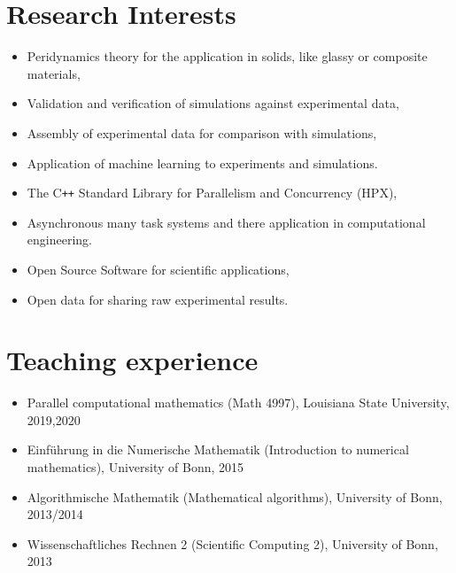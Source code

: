 \documentclass[11pt,a4paper,sans]{moderncv}
\begin{document}
\section{Research Interests}

\begin{itemize}[leftmargin=4cm]
\item Peridynamics theory for the application in solids, like glassy or composite materials,
\item Validation and verification of simulations against experimental data,
\item Assembly of experimental data for comparison with simulations,
\item Application of machine learning to experiments and simulations.
\end{itemize}
\begin{itemize}[leftmargin=4cm]
\item The C\texttt{++} Standard Library for Parallelism and Concurrency (HPX),
\item Asynchronous many task systems and there application in computational engineering.
\end{itemize}
\begin{itemize}[leftmargin=4cm]
\item Open Source Software for scientific applications,
\item Open data for sharing raw experimental results.
\end{itemize}
\section{Teaching experience}
\begin{itemize}[leftmargin=4cm]
\item Parallel computational mathematics (Math 4997), Louisiana State University, 2019,2020
\end{itemize}

\begin{itemize}[leftmargin=4cm]
\item Einf\"uhrung in die Numerische Mathematik (Introduction to numerical mathematics), University of Bonn, 2015
\item Algorithmische Mathematik (Mathematical algorithms), University of Bonn, 2013/2014
\item Wissenschaftliches Rechnen 2 (Scientific Computing 2),  University of Bonn, 2013 
\end{itemize}
\end{document}
